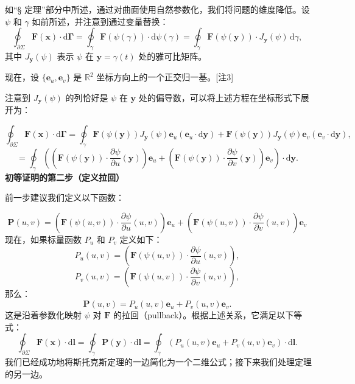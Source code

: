 如“§ 定理”部分中所述，通过对曲面使用自然参数化，我们将问题的维度降低。设 \(\psi\) 和 \(\gamma\) 如前所述，并注意到通过变量替换：
\[
\oint_{\partial \Sigma} \mathbf{F}(\mathbf{x}) \cdot \mathrm{d} \mathbf{\Gamma} 
= \oint_{\gamma} \mathbf{F}(\psi(\gamma)) \cdot \mathrm{d} \psi(\gamma) 
= \oint_{\gamma} \mathbf{F}(\psi(\mathbf{y})) \cdot J_{\mathbf{y}}(\psi) \, \mathrm{d} \gamma,~
\]
其中 \(J_{\mathbf{y}}(\psi)\) 表示 \(\psi\) 在 \(\mathbf{y} = \gamma(t)\) 处的雅可比矩阵。

现在，设 \(\{ \mathbf{e}_u, \mathbf{e}_v \}\) 是 \(\mathbb{R}^2\) 坐标方向上的一个正交归一基。[注3]

注意到 \(J_{\mathbf{y}}(\psi)\) 的列恰好是 \(\psi\) 在 \(\mathbf{y}\) 处的偏导数，可以将上述方程在坐标形式下展开为：

\[
\oint_{\partial \Sigma} \mathbf{F}(\mathbf{x}) \cdot \mathrm{d} \mathbf{\Gamma} 
= \oint_{\gamma} \mathbf{F}(\psi(\mathbf{y})) J_{\mathbf{y}}(\psi) \mathbf{e}_u (\mathbf{e}_u \cdot \mathrm{d} \mathbf{y}) 
+ \mathbf{F}(\psi(\mathbf{y})) J_{\mathbf{y}}(\psi) \mathbf{e}_v (\mathbf{e}_v \cdot \mathrm{d} \mathbf{y}),~
\]
\[
=\oint_{\gamma} \left( 
\left( \mathbf{F}(\psi(\mathbf{y})) \cdot \frac{\partial \psi}{\partial u}(\mathbf{y}) \right) \mathbf{e}_u 
+ \left( \mathbf{F}(\psi(\mathbf{y})) \cdot \frac{\partial \psi}{\partial v}(\mathbf{y}) \right) \mathbf{e}_v 
\right) \cdot \mathrm{d} \mathbf{y}.~
\]
\textbf{初等证明的第二步（定义拉回）}

前一步建议我们定义以下函数：

\[
\mathbf{P}(u, v) = \left( \mathbf{F}(\psi(u, v)) \cdot \frac{\partial {\psi}}{\partial u}(u, v) \right) \mathbf{e}_u + \left( \mathbf{F}(\psi(u, v)) \cdot \frac{\partial \psi}{\partial v}(u, v) \right) \mathbf{e}_v~
\]
现在，如果标量函数 \(P_u\) 和 \(P_v\) 定义如下：
\[
P_u(u, v) = \left( \mathbf{F}(\psi(u, v)) \cdot \frac{\partial \psi}{\partial u}(u, v) \right),~
\]
\[
P_v(u, v) = \left( \mathbf{F}(\psi(u, v)) \cdot \frac{\partial \psi}{\partial v}(u, v) \right),~
\]
那么：
\[
\mathbf{P}(u, v) = P_u(u, v) \mathbf{e}_u + P_v(u, v) \mathbf{e}_v.~
\]
这是沿着参数化映射 \(\psi\) 对 \(\mathbf{F}\) 的拉回（pullback）。根据上述关系，它满足以下等式：
\[
\oint_{\partial \Sigma} \mathbf{F}(\mathbf{x}) \cdot \mathrm{d} \mathbf{l} 
= \oint_{\gamma} \mathbf{P}(\mathbf{y}) \cdot \mathrm{d} \mathbf{l} 
= \oint_{\gamma} \left( P_u(u, v) \mathbf{e}_u + P_v(u, v) \mathbf{e}_v \right) \cdot \mathrm{d} \mathbf{l}.~
\]
我们已经成功地将斯托克斯定理的一边简化为一个二维公式；接下来我们处理定理的另一边。

